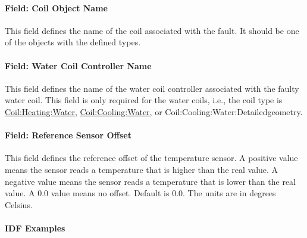 \paragraph{Field: Coil Object Name}\label{field-coil-object-name}

This field defines the name of the coil associated with the fault. It should be one of the objects with the defined types.

\paragraph{Field: Water Coil Controller Name}\label{field-water-coil-controller-name}

This field defines the name of the water coil controller associated with the faulty water coil. This field is only required for the water coils, i.e., the coil type is \hyperref[coilheatingwater]{Coil:Heating:Water}, \hyperref[coilcoolingwater]{Coil:Cooling:Water}, or Coil:Cooling:Water:Detailedgeometry.

\paragraph{Field: Reference Sensor Offset}\label{field-reference-sensor-offset}

This field defines the reference offset of the temperature sensor. A positive value means the sensor reads a temperature that is higher than the real value. A negative value means the sensor reads a temperature that is lower than the real value. A 0.0 value means no offset. Default is 0.0. The units are in degrees Celsius.

\paragraph{IDF Examples}

